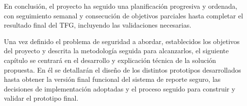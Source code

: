 En conclusión, el proyecto ha seguido una planificación progresiva y ordenada, con seguimiento semanal y consecución de objetivos parciales hasta completar el resultado final del TFG, incluyendo las validaciones necesarias.

\newpage

Una vez definido el problema de seguridad a abordar, establecidos los objetivos del proyecto y descrita la metodología seguida para alcanzarlos, el siguiente capítulo se centrará en el desarrollo y explicación técnica de la solución propuesta.
En él se detallarán el diseño de los distintos prototipos desarrollados hasta obtener la versión final funcional del sistema de reporte seguro, las decisiones de implementación adoptadas y el proceso seguido para construir y validar el prototipo final.
